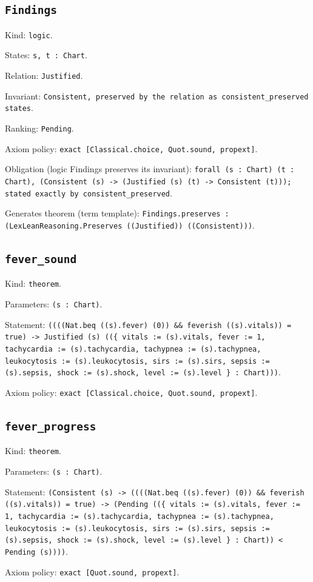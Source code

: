 \documentclass[11pt]{article}
\begin{document}
\subsection*{\texttt{Findings}}
\noindent Kind: \texttt{logic}.\par
\noindent States: \texttt{s, t : Chart}.\par
\noindent Relation: \texttt{Justified}.\par
\noindent Invariant: \texttt{Consistent, preserved by the relation as consistent\_preserved states}.\par
\noindent Ranking: \texttt{Pending}.\par
\noindent Axiom policy: \texttt{exact [Classical.choice, Quot.sound, propext]}.\par
\noindent Obligation (logic Findings preserves its invariant): \texttt{forall (s : Chart) (t : Chart), (Consistent (s) -> (Justified (s) (t) -> Consistent (t))); stated exactly by consistent\_preserved}.\par
\noindent Generates theorem (term template): \texttt{Findings.preserves : (LexLeanReasoning.Preserves ((Justified)) ((Consistent)))}.\par
\subsection*{\texttt{fever\_sound}}
\noindent Kind: \texttt{theorem}.\par
\noindent Parameters: \texttt{(s : Chart)}.\par
\noindent Statement: \texttt{((((Nat.beq ((s).fever) (0)) \&\& feverish ((s).vitals)) = true) -> Justified (s) ((\{ vitals := (s).vitals, fever := 1, tachycardia := (s).tachycardia, tachypnea := (s).tachypnea, leukocytosis := (s).leukocytosis, sirs := (s).sirs, sepsis := (s).sepsis, shock := (s).shock, level := (s).level \} : Chart)))}.\par
\noindent Axiom policy: \texttt{exact [Classical.choice, Quot.sound, propext]}.\par
\subsection*{\texttt{fever\_progress}}
\noindent Kind: \texttt{theorem}.\par
\noindent Parameters: \texttt{(s : Chart)}.\par
\noindent Statement: \texttt{(Consistent (s) -> ((((Nat.beq ((s).fever) (0)) \&\& feverish ((s).vitals)) = true) -> (Pending ((\{ vitals := (s).vitals, fever := 1, tachycardia := (s).tachycardia, tachypnea := (s).tachypnea, leukocytosis := (s).leukocytosis, sirs := (s).sirs, sepsis := (s).sepsis, shock := (s).shock, level := (s).level \} : Chart)) < Pending (s))))}.\par
\noindent Axiom policy: \texttt{exact [Quot.sound, propext]}.\par
\end{document}
